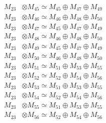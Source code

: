 \begin{align*}
M_{23} &\otimes M_{45} \simeq M_{45} \oplus M_{47} \oplus M_{49} \\
M_{23} &\otimes M_{46} \simeq M_{46} \oplus M_{48} \oplus M_{50} \\
M_{23} &\otimes M_{47} \simeq M_{45} \oplus M_{47} \oplus M_{49} \\
M_{23} &\otimes M_{48} \simeq M_{46} \oplus M_{48} \oplus M_{50} \\
M_{23} &\otimes M_{49} \simeq M_{45} \oplus M_{47} \oplus M_{49} \\
M_{23} &\otimes M_{50} \simeq M_{46} \oplus M_{48} \oplus M_{50} \\
M_{23} &\otimes M_{51} \simeq M_{51} \oplus M_{53} \oplus M_{55} \\
M_{23} &\otimes M_{52} \simeq M_{52} \oplus M_{54} \oplus M_{56} \\
M_{23} &\otimes M_{53} \simeq M_{51} \oplus M_{53} \oplus M_{55} \\
M_{23} &\otimes M_{54} \simeq M_{52} \oplus M_{54} \oplus M_{56} \\
M_{23} &\otimes M_{55} \simeq M_{51} \oplus M_{53} \oplus M_{55} \\
M_{23} &\otimes M_{56} \simeq M_{52} \oplus M_{54} \oplus M_{56} \\
\end{align*}

